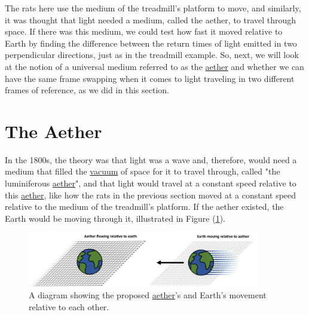 The rats here use the medium of the treadmill's platform to move, and similarly, it was thought that light needed a medium, called the aether, to travel through space.
If there was this medium, we could test how fast it moved relative to Earth by finding the difference between the return times of light emitted in two perpendicular directions, just as in the treadmill example.
So, next, we will look at the notion of a universal medium referred to as the \hyperlink{def-aether}{aether} and whether we can have the same frame swapping when it comes to light traveling in two different frames of reference, as we did in this section.

\section{The Aether}%

In the 1800s, the theory was that light was a wave and, therefore, would need a medium that filled the \hyperlink{def-vacuum}{vacuum} of space for it to travel through, called "the luminiferous \hyperlink{def-aether}{aether}", and that light would travel at a constant speed relative to this \hyperlink{def-aether}{aether}, like how the rats in the previous section moved at a constant speed relative to the medium of the treadmill's platform.
If the aether existed, the Earth would be moving through it, illustrated in Figure (\ref{fig: Aether}).

\begin{figure}[ht]
	\centering
	\includegraphics[width=0.9\textwidth]{images/pdf/earth_and_aether.pdf}
	\caption{A diagram showing the proposed \protect\hyperlink{def-aether}{aether}'s and Earth's movement relative to each other.}
	\label{fig: Aether}
\end{figure}

